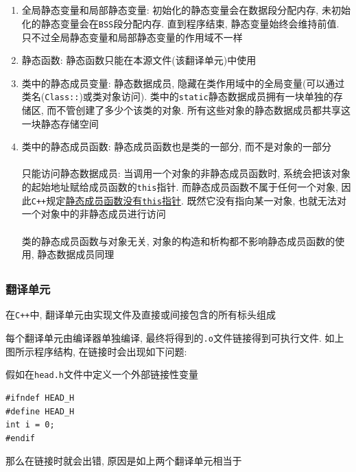 \subsection{}
\begin{enumerate}
	\item 全局静态变量和局部静态变量: 初始化的静态变量会在数据段分配内存, 未初始化的静态变量会在{\tt BSS}段分配内存. 
			直到程序结束, 静态变量始终会维持前值. 只不过全局静态变量和局部静态变量的作用域不一样
	\item 静态函数: 静态函数只能在本源文件(该翻译单元)中使用
	\item 类中的静态成员变量: 静态数据成员, 隐藏在类作用域中的全局变量(可以通过类名({\tt Class::})或类对象访问). 
			类中的{\tt static}静态数据成员拥有一块单独的存储区, 而不管创建了多少个该类的对象. 
			所有这些对象的静态数据成员都共享这一块静态存储空间
	\item 类中的静态成员函数: 静态成员函数也是类的一部分, 而不是对象的一部分
		\\ \\  只能访问静态数据成员: 
			当调用一个对象的非静态成员函数时, 系统会把该对象的起始地址赋给成员函数的{\tt this}指针. 
			而静态成员函数不属于任何一个对象, 因此{\tt C++}规定\uline{静态成员函数没有{\tt this}指针}. 
			既然它没有指向某一对象, 也就无法对一个对象中的非静态成员进行访问
		\\ \\  类的静态成员函数与对象无关, 对象的构造和析构都不影响静态成员函数的使用, 静态数据成员同理
\end{enumerate}
\subsection{}
\subsubsection{翻译单元}
在{\tt C++}中, 翻译单元由实现文件及直接或间接包含的所有标头组成



\noindent 每个翻译单元由编译器单独编译, 最终将得到的{\tt .o}文件链接得到可执行文件. 如上图所示程序结构, 在链接时会出现如下问题:

假如在{\tt head.h}文件中定义一个外部链接性变量

\begin{lstlisting}[xleftmargin=2em]
#ifndef HEAD_H
#define HEAD_H
int i = 0;
#endif
\end{lstlisting}
那么在链接时就会出错, 原因是如上两个翻译单元相当于

